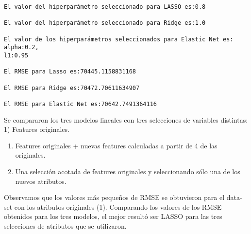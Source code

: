 \documentclass[11pt]{article}
\begin{document}
    \begin{Verbatim}[commandchars=\\\{\}]
El valor del hiperparámetro seleccionado para LASSO es:0.8

El valor del hiperparámetro seleccionado para Ridge es:1.0

El valor de los hiperparámetros seleccionados para Elastic Net es: alpha:0.2,
l1:0.95

El RMSE para Lasso es:70445.1158831168

El RMSE para Ridge es:70472.70611634907

El RMSE para Elastic Net es:70642.7491364116

    \end{Verbatim}

    Se compararon los tres modelos lineales con tres selecciones de
variables distintas: 1) Features originales.

\begin{enumerate}
\def\labelenumi{\arabic{enumi})}
\setcounter{enumi}{1}
\item
  Features originales + nuevas features calculadas a partir de 4 de las
  originales.
\item
  Una selección acotada de features originales y seleccionando sólo una
  de los nuevos atributos.
\end{enumerate}

Observamos que los valores más pequeños de RMSE se obtuvieron para el
data-set con los atributos originales (1). Comparando los valores de los
RMSE obtenidos para los tres modelos, el mejor resultó ser LASSO para
las tres selecciones de atributos que se utilizaron.


    
    
    
\end{document}
